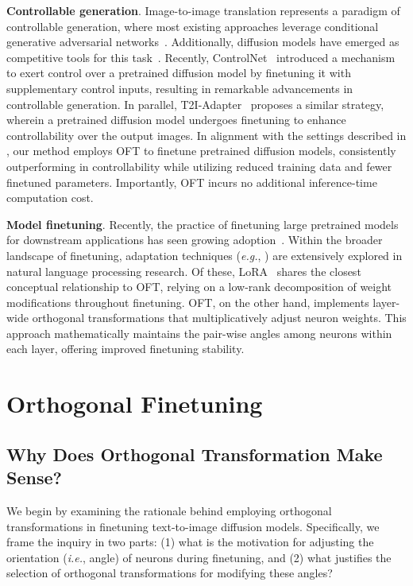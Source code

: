\textbf{Controllable generation}. Image-to-image translation represents a paradigm of controllable generation, where most existing approaches leverage conditional generative adversarial networks~\cite{isola2017image,zhu2017toward,wang2018high,park2019semantic,choi2018stargan}. Additionally, diffusion models have emerged as competitive tools for this task~\cite{saharia2022palette,voynov2022sketch,wang2022pretraining}. Recently, ControlNet~\cite{zhang2023adding} introduced a mechanism to exert control over a pretrained diffusion model by finetuning it with supplementary control inputs, resulting in remarkable advancements in controllable generation. In parallel, T2I-Adapter~\cite{mou2023t2i} proposes a similar strategy, wherein a pretrained diffusion model undergoes finetuning to enhance controllability over the output images. In alignment with the settings described in \cite{zhang2023adding,mou2023t2i}, our method employs OFT to finetune pretrained diffusion models, consistently outperforming in controllability while utilizing reduced training data and fewer finetuned parameters. Importantly, OFT incurs no additional inference-time computation cost.

\textbf{Model finetuning}. Recently, the practice of finetuning large pretrained models for downstream applications has seen growing adoption~\cite{devlin2018bert,brown2020language,he2022masked}. Within the broader landscape of finetuning, adaptation techniques (\emph{e.g.}, \cite{hulora2022,houlsby2019parameter,pfeiffer2020adapterfusion}) are extensively explored in natural language processing research. Of these, LoRA~\cite{hulora2022} shares the closest conceptual relationship to OFT, relying on a low-rank decomposition of weight modifications throughout finetuning. OFT, on the other hand, implements layer-wide orthogonal transformations that multiplicatively adjust neuron weights. This approach mathematically maintains the pair-wise angles among neurons within each layer, offering improved finetuning stability.

\section{Orthogonal Finetuning}

\subsection{Why Does Orthogonal Transformation Make Sense?}

We begin by examining the rationale behind employing orthogonal transformations in finetuning text-to-image diffusion models. Specifically, we frame the inquiry in two parts: (1) what is the motivation for adjusting the orientation (\emph{i.e.}, angle) of neurons during finetuning, and (2) what justifies the selection of orthogonal transformations for modifying these angles?

